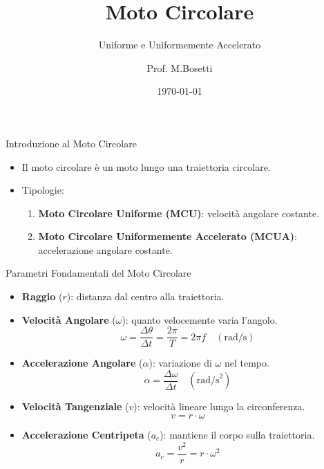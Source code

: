 \documentclass{beamer}
\title{Moto Circolare}
\subtitle{Uniforme e Uniformemente Accelerato}
\author{Prof. M.Bosetti}
\date{\today}
\begin{document}
\begin{frame}
    \titlepage
\end{frame}

\begin{frame}{Introduzione al Moto Circolare}
    \begin{itemize}
        \item Il moto circolare è un moto lungo una traiettoria circolare.
        \item Tipologie:
        \begin{enumerate}
            \item \textbf{Moto Circolare Uniforme (MCU)}: velocità angolare costante.
            \item \textbf{Moto Circolare Uniformemente Accelerato (MCUA)}: accelerazione angolare costante.
        \end{enumerate}
    \end{itemize}
    \vspace{1cm}
\end{frame}

\begin{frame}{Parametri Fondamentali del Moto Circolare}
    \begin{itemize}
        \item \textbf{Raggio} (\(r\)): distanza dal centro alla traiettoria.
        \item \textbf{Velocità Angolare} (\(\omega\)): quanto velocemente varia l'angolo.
        \[ \omega = \frac{\Delta\theta}{\Delta t} = \frac{2\pi}{T}= 2\pi f  \quad (\text{rad/s}) \]
        \item \textbf{Accelerazione Angolare} (\(\alpha\)): variazione di \(\omega\) nel tempo.
        \[ \alpha = \frac{\Delta\omega}{\Delta t} \quad (\text{rad/s}^2) \]
        \item \textbf{Velocità Tangenziale} (\(v\)): velocità lineare lungo la circonferenza.
        \[ v = r \cdot \omega \]
        \item \textbf{Accelerazione Centripeta} (\(a_c\)): mantiene il corpo sulla traiettoria.
        \[ a_c = \frac{v^2}{r} = r \cdot \omega^2 \]
    \end{itemize}
\end{frame}
\end{document}
